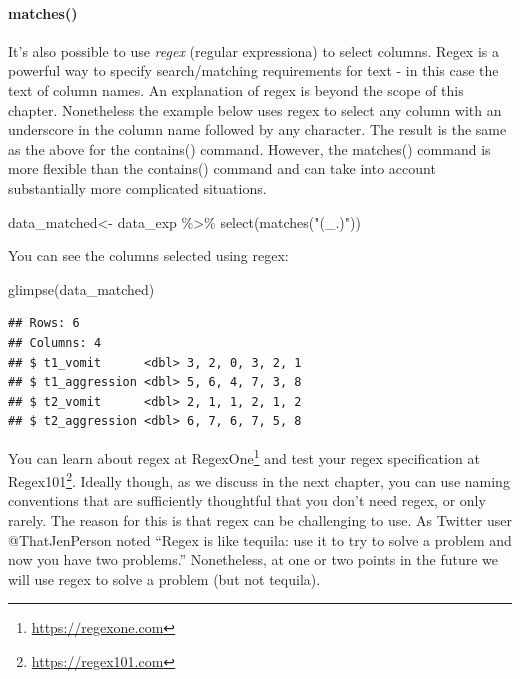\documentclass[
]{krantz}
\makeatletter
\newenvironment{Shaded}{\begin{snugshade}}{\end{snugshade}}
\newcommand{\FunctionTok}[1]{\textcolor[rgb]{0,0,0}{#1}}
\newcommand{\NormalTok}[1]{#1}
\newcommand{\OtherTok}[1]{\textcolor[rgb]{0.37,0.37,0.37}{#1}}
\newcommand{\SpecialCharTok}[1]{\textcolor[rgb]{0,0,0}{#1}}
\newcommand{\StringTok}[1]{\textcolor[rgb]{0.5,0.5,0.5}{#1}}
\renewcommand{\href}[2]{#2\footnote{\url{#1}}}
\newenvironment{kframe}{%
\medskip{}
\setlength{\fboxsep}{.8em}
 \def\at@end@of@kframe{}%
 \ifinner\ifhmode%
  \def\at@end@of@kframe{\end{minipage}}%
  \begin{minipage}{\columnwidth}%
 \fi\fi%
 \def\FrameCommand##1{\hskip\@totalleftmargin \hskip-\fboxsep
 \colorbox{shadecolor}{##1}\hskip-\fboxsep
     \hskip-\linewidth \hskip-\@totalleftmargin \hskip\columnwidth}%
 \MakeFramed {\advance\hsize-\width
   \@totalleftmargin\z@ \linewidth\hsize
   \@setminipage}}%
 {\par\unskip\endMakeFramed%
 \at@end@of@kframe}
\renewenvironment{Shaded}{\begin{kframe}}{\end{kframe}}
\makeatother
\begin{document}
\hypertarget{matches}{%
\paragraph{matches()}\label{matches}}

It's also possible to use \emph{regex} (regular expressiona) to select columns. Regex is a powerful way to specify search/matching requirements for text - in this case the text of column names. An explanation of regex is beyond the scope of this chapter. Nonetheless the example below uses regex to select any column with an underscore in the column name followed by any character. The result is the same as the above for the contains() command. However, the matches() command is more flexible than the contains() command and can take into account substantially more complicated situations.

\begin{Shaded}
\begin{Highlighting}[]
\NormalTok{data\_matched}\OtherTok{\textless{}{-}}\NormalTok{ data\_exp }\SpecialCharTok{\%\textgreater{}\%} 
  \FunctionTok{select}\NormalTok{(}\FunctionTok{matches}\NormalTok{(}\StringTok{"(\_.)"}\NormalTok{))}
\end{Highlighting}
\end{Shaded}

You can see the columns selected using regex:

\begin{Shaded}
\begin{Highlighting}[]
\FunctionTok{glimpse}\NormalTok{(data\_matched)}
\end{Highlighting}
\end{Shaded}

\begin{verbatim}
## Rows: 6
## Columns: 4
## $ t1_vomit      <dbl> 3, 2, 0, 3, 2, 1
## $ t1_aggression <dbl> 5, 6, 4, 7, 3, 8
## $ t2_vomit      <dbl> 2, 1, 1, 2, 1, 2
## $ t2_aggression <dbl> 6, 7, 6, 7, 5, 8
\end{verbatim}

You can learn about regex at \href{https://regexone.com}{RegexOne} and test your regex specification at \href{https://regex101.com}{Regex101}. Ideally though, as we discuss in the next chapter, you can use naming conventions that are sufficiently thoughtful that you don't need regex, or only rarely. The reason for this is that regex can be challenging to use. As Twitter user @ThatJenPerson noted ``Regex is like tequila: use it to try to solve a problem and now you have two problems.'' Nonetheless, at one or two points in the future we will use regex to solve a problem (but not tequila).
\end{document}
